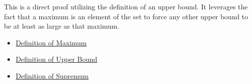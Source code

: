 \begin{remark*}
This is a direct proof utilizing the definition of an upper bound. It leverages the fact that a maximum is an element of the set to force any other upper bound to be at least as large as that maximum.
\end{remark*}

\begin{dependencies}
\begin{itemize}
  \item \hyperref[def:maximum]{Definition of Maximum}
  \item \hyperref[def:upper-bound]{Definition of Upper Bound}
  \item \hyperref[def:supremum]{Definition of Supremum}
\end{itemize}
\end{dependencies}

\clearpage
